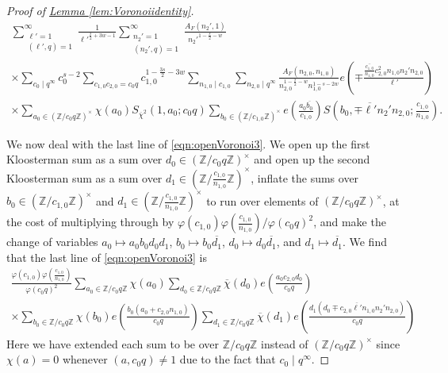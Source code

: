 \documentclass[11pt,a4paper]{amsart}
\newcommand{\Z}{\mathbb{Z}}
\numberwithin{equation}{section}
\theoremstyle{remark}
\theoremstyle{definition}
\begin{document}
\begin{proof}[Proof of {\hyperref[lem:Voronoiidentity]{Lemma \ref*{lem:Voronoiidentity}}}]
\begin{multline}
\label{eqn:openVoronoi3}
\sum_{\substack{\ell' = 1 \\ (\ell',q) = 1}}^{\infty} \frac{1}{{\ell'}^{\frac{s}{2} + 3w - 1}} \sum_{\substack{n_2' = 1 \\ (n_2',q) = 1}}^{\infty} \frac{A_F(n_2',1)}{{n_2'}^{1 - \frac{s}{2} - w}}	\\
\times \sum_{c_0 \mid q^{\infty}} c_0^{s - 2} \sum_{c_{1,0} c_{2,0} = c_0 q} c_{1,0}^{1 - \frac{3s}{2} - 3w} \sum_{n_{1,0} \mid c_{1,0}} \sum_{n_{2,0} \mid q^{\infty}} \frac{A_F(n_{2,0},n_{1,0})}{n_{2,0}^{1 - \frac{s}{2} - w} n_{1,0}^{1 - s - 2w}} e\left(\mp \frac{\overline{\frac{c_{1,0}}{n_{1,0}}} c_{2,0}^2 n_{1,0} n_2' n_{2,0}}{\ell'}\right)	\\
\times \sum_{a_0 \in (\Z/c_0 q\Z)^{\times}} \chi(a_0) S_{\overline{\chi}^2}(1,a_0;c_0 q) \sum_{b_0 \in (\Z/c_{1,0}\Z)^{\times}} e\left(\frac{a_0 \overline{b_0}}{c_{1,0}}\right) S\left(b_0, \mp \overline{\ell'} n_2' n_{2,0}; \frac{c_{1,0}}{n_{1,0}}\right).
\end{multline}

We now deal with the last line of \eqref{eqn:openVoronoi3}. We open up the first Kloosterman sum as a sum over $d_0 \in (\Z/c_0 q\Z)^{\times}$ and open up the second Kloosterman sum as a sum over $d_1 \in (\Z/\frac{c_{1,0}}{n_{1,0}}\Z)^{\times}$, inflate the sums over $b_0 \in (\Z/c_{1,0}\Z)^{\times}$ and $d_1 \in (\Z/\frac{c_{1,0}}{n_{1,0}}\Z)^{\times}$ to run over elements of $(\Z/c_0 q\Z)^{\times}$, at the cost of multiplying through by $\varphi(c_{1,0}) \varphi(\frac{c_{1,0}}{n_{1,0}}) / \varphi(c_0 q)^2$, and make the change of variables $a_0 \mapsto a_0 b_0 d_0 d_1$, $b_0 \mapsto b_0 \overline{d_1}$, $d_0 \mapsto d_0 \overline{d_1}$, and $d_1 \mapsto \overline{d_1}$. We find that the last line of \eqref{eqn:openVoronoi3} is
\begin{multline*}
\frac{\varphi(c_{1,0}) \varphi\left(\frac{c_{1,0}}{n_{1,0}}\right)}{\varphi(c_0 q)^2} \sum_{a_0 \in \Z/c_0 q\Z} \chi(a_0) \sum_{d_0 \in \Z/c_0 q\Z} \overline{\chi}(d_0) e\left(\frac{a_0 c_{2,0} d_0}{c_0 q}\right)	\\
\times \sum_{b_0 \in \Z/c_0 q\Z} \chi(b_0) e\left(\frac{b_0 (a_0 + c_{2,0} n_{1,0})}{c_0 q}\right) \sum_{d_1 \in \Z/c_0 q\Z} \overline{\chi}(d_1) e\left(\frac{d_1 (d_0 \mp c_{2,0} \overline{\ell'} n_{1,0} n_2' n_{2,0})}{c_0 q}\right)
\end{multline*}
Here we have extended each sum to be over $\Z/c_0 q\Z$ instead of $(\Z/c_0 q\Z)^{\times}$ since $\chi(a) = 0$ whenever $(a,c_0 q) \neq 1$ due to the fact that $c_0 \mid q^{\infty}$.


\end{proof}
\end{document}
